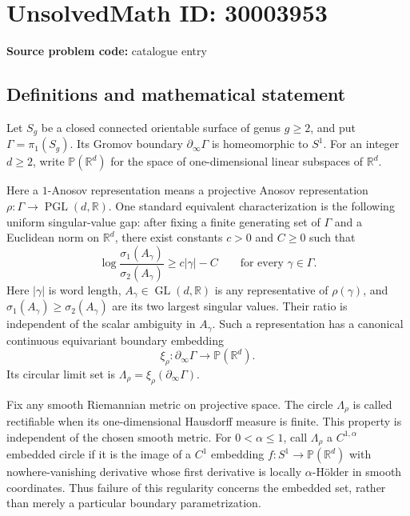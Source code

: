 \documentclass[11pt]{article}
\begin{document}
\section*{UnsolvedMath ID: 30003953}
\textbf{Source problem code:} catalogue entry
\subsection{Definitions and mathematical statement}
Let \(S_g\) be a closed connected orientable surface of genus \(g\geq 2\), and put \(\Gamma=\pi_1(S_g)\). Its Gromov boundary \(\partial_\infty\Gamma\) is homeomorphic to \(S^1\). For an integer \(d\geq 2\), write \(\mathbb P(\mathbb R^d)\) for the space of one-dimensional linear subspaces of \(\mathbb R^d\).

Here a \(1\)-Anosov representation means a projective Anosov representation \(\rho:\Gamma\to\operatorname{PGL}(d,\mathbb R)\). One standard equivalent characterization is the following uniform singular-value gap: after fixing a finite generating set of \(\Gamma\) and a Euclidean norm on \(\mathbb R^d\), there exist constants \(c>0\) and \(C\geq 0\) such that
\[
\log\frac{\sigma_1(A_\gamma)}{\sigma_2(A_\gamma)}\geq c|\gamma|-C
\qquad\text{for every }\gamma\in\Gamma.
\]
Here \(|\gamma|\) is word length, \(A_\gamma\in\operatorname{GL}(d,\mathbb R)\) is any representative of \(\rho(\gamma)\), and \(\sigma_1(A_\gamma)\geq\sigma_2(A_\gamma)\) are its two largest singular values. Their ratio is independent of the scalar ambiguity in \(A_\gamma\). Such a representation has a canonical continuous equivariant boundary embedding
\[
\xi_\rho:\partial_\infty\Gamma\longrightarrow\mathbb P(\mathbb R^d).
\]
Its circular limit set is \(\Lambda_\rho=\xi_\rho(\partial_\infty\Gamma)\).

Fix any smooth Riemannian metric on projective space. The circle \(\Lambda_\rho\) is called rectifiable when its one-dimensional Hausdorff measure is finite. This property is independent of the chosen smooth metric. For \(0<\alpha\leq 1\), call \(\Lambda_\rho\) a \(C^{1,\alpha}\) embedded circle if it is the image of a \(C^1\) embedding \(f:S^1\to\mathbb P(\mathbb R^d)\) with nowhere-vanishing derivative whose first derivative is locally \(\alpha\)-Hölder in smooth coordinates. Thus failure of this regularity concerns the embedded set, rather than merely a particular boundary parametrization.
\end{document}
